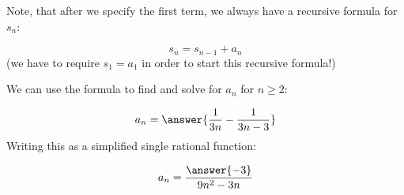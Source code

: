 \documentclass{ximera}
\begin{document}
\begin{exercise}
\begin{hint}
Note, that after we specify the first term, we always have a recursive formula for $s_n$:

\[
s_n = s_{n-1}+a_n
\]
(we have to require $s_1=a_1$ in order to start this recursive formula!)

We can use the formula to find  and solve for $a_n$ for $n \geq 2$:

\[
a_n = \answer{\frac{1}{3n}-\frac{1}{3n-3}}
\]
Writing this as a simplified single rational function:

\[
a_n = \frac{\answer{-3}}{9n^2-3n}
\]

\end{hint}
\end{exercise}
\end{document}

